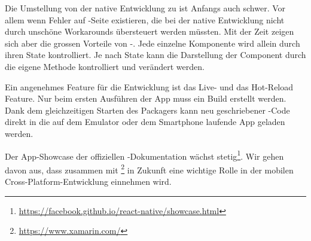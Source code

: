 Die Umstellung von der native Entwicklung zu  ist Anfangs auch schwer. 
Vor allem wenn Fehler auf -Seite existieren, die bei der native Entwicklung nicht durch unschöne Workarounds übersteuert werden müssten. 
Mit der Zeit zeigen sich aber die grossen Vorteile von -. 
Jede einzelne Komponente wird allein durch ihren State kontrolliert. 
Je nach State kann die Darstellung der Component durch die eigene  Methode kontrolliert und verändert werden. 

Ein angenehmes Feature für die Entwicklung ist das Live- und das Hot-Reload Feature. 
Nur beim ersten Ausführen der App muss ein Build erstellt werden.
Dank dem gleichzeitigen Starten des \gls{Packager}s kann neu geschriebener -Code direkt in  die auf dem Emulator oder dem Smartphone laufende App geladen werden.

Der App-Showcase der offiziellen -Dokumentation wächst stetig\footnote{\url{https://facebook.github.io/react-native/showcase.html}}.
Wir gehen davon aus, dass  zusammen mit \footnote{\url{https://www.xamarin.com/}} in Zukunft eine wichtige Rolle in der mobilen Cross-Platform-Entwicklung einnehmen wird.